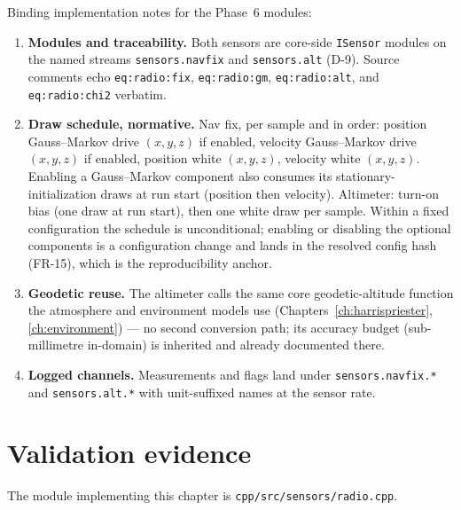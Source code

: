 Binding implementation notes for the Phase~6 modules:
\begin{enumerate}
  \item \textbf{Modules and traceability.} Both sensors are core-side
    \texttt{ISensor} modules on the named streams
    \texttt{sensors.navfix} and \texttt{sensors.alt} (D-9). Source
    comments echo \texttt{eq:radio:fix}, \texttt{eq:radio:gm},
    \texttt{eq:radio:alt}, and \texttt{eq:radio:chi2} verbatim.
  \item \textbf{Draw schedule, normative.} Nav fix, per sample and in
    order: position Gauss--Markov drive $(x,y,z)$ if enabled, velocity
    Gauss--Markov drive $(x,y,z)$ if enabled, position white $(x,y,z)$,
    velocity white $(x,y,z)$. Enabling a Gauss--Markov component also
    consumes its stationary-initialization draws at run start (position
    then velocity). Altimeter: turn-on bias (one draw at run start),
    then one white draw per sample. Within a fixed configuration the
    schedule is unconditional; enabling or disabling the optional
    components is a configuration change and lands in the resolved
    config hash (FR-15), which is the reproducibility anchor.
  \item \textbf{Geodetic reuse.} The altimeter calls the same core
    geodetic-altitude function the atmosphere and environment models
    use (Chapters~\ref{ch:harrispriester}, \ref{ch:environment}) --- no
    second conversion path; its accuracy budget
    (sub-millimetre in-domain) is inherited and already documented
    there.
  \item \textbf{Logged channels.} Measurements and flags land under
    \texttt{sensors.navfix.*} and \texttt{sensors.alt.*} with
    unit-suffixed names at the sensor rate.
\end{enumerate}

\section{Validation evidence}
\label{sec:radio:validation}

The module implementing this chapter is
\texttt{cpp/src/sensors/radio.cpp}.

